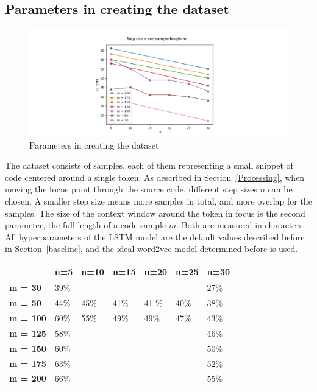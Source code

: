 \documentclass[
a4paper,
pagesize,
pdftex,
12pt,
ngerman,
fleqn,
final,
]{scrartcl}
\begin{document}
	
	\subsection{Parameters in creating the dataset}
	
	\begin{figure}[H]
		\centering
		\includegraphics[width=1\textwidth]{img/parametersmn}
		\caption{Parameters in creating the dataset}
		\label{fig:mn}
	\end{figure}
	The dataset consists of samples, each of them representing a small snippet of code centered around a single token. As described in Section~\ref{Processing}, when moving the focus point through the source code, different step sizes $n$ can be chosen. A smaller step size means more samples in total, and more overlap for the samples. The size of the context window around the token in focus is the second parameter, the full length of a code sample $m$. Both are measured in characters. All  hyperparameters of the LSTM model are the default values described before in Section~\ref{baseline}, and the ideal word2vec model determined before is used.
	
	\begin{tabular}{|p{2cm}||p{1.7cm}|p{1.7cm}|p{1.7cm}|p{1.7cm}|p{1.7cm}|p{1.7cm}|}
		\hline
		& \textbf{n=5} &\textbf{n=10} & \textbf{n=15} & \textbf{n=20} & \textbf{n=25} & \textbf{n=30} \\
		\hline
		\textbf{m = 30} & 39\% &  &  & &  & 27\% \\ 
		\textbf{m = 50} & 44\% & 45\% &41\% &41 \%& 40\% & 38\% \\ 
		\textbf{m = 100} & 60\% & 55\% &49\% &49\%&  47\% &43\% \\
		\textbf{m = 125} & 58\% &  &  & &  & 46\% \\
		\textbf{m = 150} & 60\% &  &  & &  & 50\% \\
		\textbf{m = 175} & 63\% &  &  & &  & 52\% \\
		\textbf{m = 200} & 66\% &  &  & &  & 55\% \\
		\hline
		\hline
	\end{tabular}
	
\end{document}
